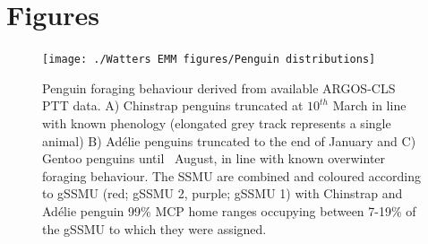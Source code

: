 \documentclass[]{elsarticle} %
\begin{document}
\section{Figures}\label{figures}

\begin{figure}
\texttt{[image: ./Watters EMM figures/Penguin distributions]} \caption{Penguin foraging behaviour derived from available ARGOS-CLS PTT data. A) Chinstrap penguins truncated at $10^{th}$ March in line with known phenology (elongated grey track represents a single animal) B) Adélie penguins truncated to the end of January and C) Gentoo penguins until ~August, in line with known overwinter foraging behaviour. The SSMU are combined and coloured according to gSSMU (red; gSSMU 2, purple; gSSMU 1) with Chinstrap and Adélie penguin 99\% MCP home ranges occupying between 7-19\% of the gSSMU to which they were assigned.  }\label{fig:Penguin distribution plots}
\end{figure}
\end{document}
